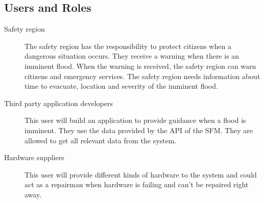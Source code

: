 \subsection{Users and Roles}
\label{subsec:users-roles}
\begin{description}
	\item[Safety region] The safety region has the responsibility to protect citizens when a dangerous situation occurs. They receive a warning when there is an imminent flood. When the warning is received, the safety region can warn citizens and emergency services. The safety region needs information about time to evacuate, location and severity of the imminent flood.
	\item[Third party application developers] This user will build an application to provide guidance when a flood is imminent. They use the data provided by the \gls{API} of the \gls{SFM}. They are allowed to get all relevant data from the system.
	\item[Hardware suppliers] This user will provide different kinds of hardware to the system and could act as a repairman when hardware is failing and can't be repaired right away.
\end{description} 

